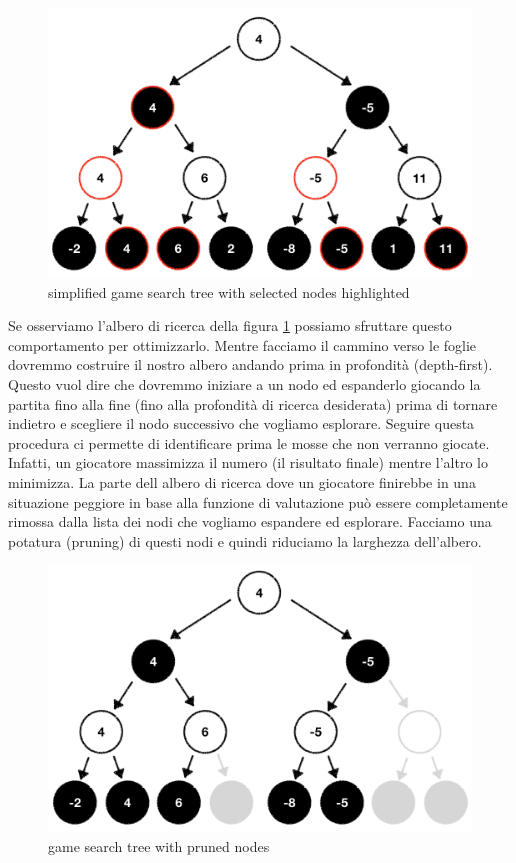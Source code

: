 \documentclass{article}
\begin{document}
\begin{figure}[htbp]
  \centering
  \includegraphics[width=0.75\linewidth]{img/minimax.png}
  \caption{simplified game search tree with selected nodes highlighted}
  \label{fig:minimax}
\end{figure}

Se osserviamo l'albero di ricerca della figura \ref{fig:minimax} possiamo sfruttare questo comportamento per ottimizzarlo.
Mentre facciamo il cammino verso le foglie dovremmo costruire il nostro albero andando prima in profondità (depth-first).
Questo vuol dire che dovremmo iniziare a un nodo ed espanderlo giocando la partita fino alla fine (fino alla profondità di ricerca desiderata) prima di tornare indietro e scegliere il nodo successivo che vogliamo esplorare.
Seguire questa procedura ci permette di identificare prima le mosse che non verranno giocate.
Infatti, un giocatore massimizza il numero (il risultato finale) mentre l'altro lo minimizza.
La parte dell albero di ricerca dove un giocatore finirebbe in una situazione peggiore in base alla funzione di valutazione può essere completamente rimossa dalla lista dei nodi che vogliamo espandere ed esplorare.
Facciamo una potatura (pruning) di questi nodi e quindi riduciamo la larghezza dell'albero.

\begin{figure}[htbp]
  \centering
  \includegraphics[width=0.75\linewidth]{img/minimax_ab.png}
  \caption{game search tree with pruned nodes}
  \label{fig:minimax_ab}
\end{figure}
\end{document}
